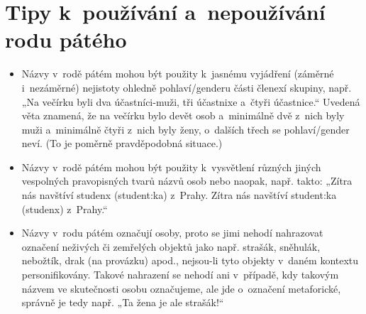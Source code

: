 \section{Tipy k používání a nepoužívání rodu pátého}
\begin{itemize}
\item Názvy v rodě pátém mohou být použity k jasnému vyjádření (záměrné i nezáměrné) nejistoty ohledně po\-hla\-ví/gen\-deru části členexí skupiny, např. „Na večírku byli dva účastníci-muži, tři účastnixe a čtyři účastnice.“ Uvedená věta znamená, že na večírku bylo devět osob a minimálně dvě z nich byly muži a minimálně čtyři z nich byly ženy, o dalších třech se pohlaví/gender neví. (To je poměrně pravděpodobná situace.)
\item Názvy v rodě pátém mohou být použity k vysvětlení různých jiných
vespolných pravopisných tvarů názvů osob nebo naopak, např. takto:
„Zítra nás navštíví studenx (student:ka) z Prahy. Zítra nás navštíví student:ka (studenx) z Prahy.“%
\item Názvy v rodu pátém označují osoby, proto se jimi nehodí nahrazovat označení neživých či zemřelých objektů jako např. strašák, sněhulák, nebožtík, drak (na provázku) apod., nejsou-li tyto objekty v daném kontextu personifikovány. Takové nahrazení se nehodí ani v případě, kdy takovým názvem ve skutečnosti osobu označujeme, ale jde o označení metaforické, správně je tedy např. „Ta žena je ale strašák!“
\end{itemize}

\begin{comment}
\item Názvy v rodě pátém mohou být použity při označení jedné osoby v souřadném poměru s názvy v jiných rodech, např. „Náš poslední host byl absolvenx ČVUT, překladatelka odborné literatury a laureát Nobelovy ceny za literaturu.“ Z uvedené věty jasně vyplývá, že se jedná o ženu, protože je to vyjářeno přechýleným femininem „překladatelka“. „Laureát“ je generické maskulinum, které sice může svádět k dojmu, že jde o muže, ale označení téže osoby přechýleným femininem tento výklad vylučuje, takže jediný možný výklad je, že jde o ženu a že to maskulinum je generické. Název „absolvenx“ je pak z hlediska genderu osoby zcela neutrální a označení „host“ je vespolné.
\item Názvy v rodě pátém je velmi nežádoucí dávat do vylučovacího poměru s názvy týchž skupin osob nebo jejich genderově vymezených podskupin v jiných rodech. Např. věta „Zítra nás navštíví student/studenx/studentka z Prahy“ o genderu dané osoby sděluje, že je muž/kdokoliv/žena, což dává chybný smysl. Opakované používání takového tvaru může vytvořit škodlivý stereotyp, že názvy osob v pátém rodě neoznačují ženy a muže. Je ovšem v pořádku použit názvy v jiných rodech k vysvětlení názvu v rodě pátém, např.: „Zítra nás navštíví studenx (student/ka/\ldots) z Prahy“ nebo naopak název v rodě pátém jako vysvětlení složeného tvaru, např.: „Zítra nás navštíví student/ka/\ldots{} (studenx) z Prahy.“ V případě opakovaného použití je vhodné tyto dva způsoby střídat, aby nevznikal dojem hierarchie mezi oběma formami vyjádření.
\end{comment}

